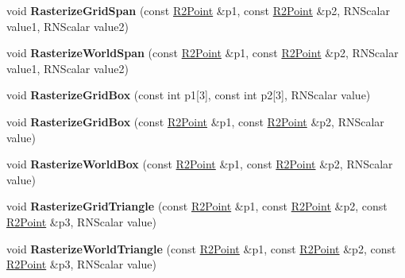 \begin{DoxyCompactItemize}
\item 
void {\bfseries Rasterize\+Grid\+Span} (const \hyperlink{class_r2_point}{R2\+Point} \&p1, const \hyperlink{class_r2_point}{R2\+Point} \&p2, R\+N\+Scalar value1, R\+N\+Scalar value2)\hypertarget{class_r2_grid_af47c16f3fcb7b3c3320d3132a03524fe}{}\label{class_r2_grid_af47c16f3fcb7b3c3320d3132a03524fe}

\item 
void {\bfseries Rasterize\+World\+Span} (const \hyperlink{class_r2_point}{R2\+Point} \&p1, const \hyperlink{class_r2_point}{R2\+Point} \&p2, R\+N\+Scalar value1, R\+N\+Scalar value2)\hypertarget{class_r2_grid_adc47db68ef062fec90193255c1750aea}{}\label{class_r2_grid_adc47db68ef062fec90193255c1750aea}

\item 
void {\bfseries Rasterize\+Grid\+Box} (const int p1\mbox{[}3\mbox{]}, const int p2\mbox{[}3\mbox{]}, R\+N\+Scalar value)\hypertarget{class_r2_grid_aa29e879ad7754e2fcdfa06b2bd524e7c}{}\label{class_r2_grid_aa29e879ad7754e2fcdfa06b2bd524e7c}

\item 
void {\bfseries Rasterize\+Grid\+Box} (const \hyperlink{class_r2_point}{R2\+Point} \&p1, const \hyperlink{class_r2_point}{R2\+Point} \&p2, R\+N\+Scalar value)\hypertarget{class_r2_grid_afdd7ed207ed8fdfd509ea999e7f27256}{}\label{class_r2_grid_afdd7ed207ed8fdfd509ea999e7f27256}

\item 
void {\bfseries Rasterize\+World\+Box} (const \hyperlink{class_r2_point}{R2\+Point} \&p1, const \hyperlink{class_r2_point}{R2\+Point} \&p2, R\+N\+Scalar value)\hypertarget{class_r2_grid_a676d91d5caa1d328a84c8c30ef8579a4}{}\label{class_r2_grid_a676d91d5caa1d328a84c8c30ef8579a4}

\item 
void {\bfseries Rasterize\+Grid\+Triangle} (const \hyperlink{class_r2_point}{R2\+Point} \&p1, const \hyperlink{class_r2_point}{R2\+Point} \&p2, const \hyperlink{class_r2_point}{R2\+Point} \&p3, R\+N\+Scalar value)\hypertarget{class_r2_grid_ab5d67a74e85bcf616809227db3ba60e1}{}\label{class_r2_grid_ab5d67a74e85bcf616809227db3ba60e1}

\item 
void {\bfseries Rasterize\+World\+Triangle} (const \hyperlink{class_r2_point}{R2\+Point} \&p1, const \hyperlink{class_r2_point}{R2\+Point} \&p2, const \hyperlink{class_r2_point}{R2\+Point} \&p3, R\+N\+Scalar value)\hypertarget{class_r2_grid_adaaab1b432d7bf370f99269c0c82978c}{}\label{class_r2_grid_adaaab1b432d7bf370f99269c0c82978c}


\end{DoxyCompactItemize}
